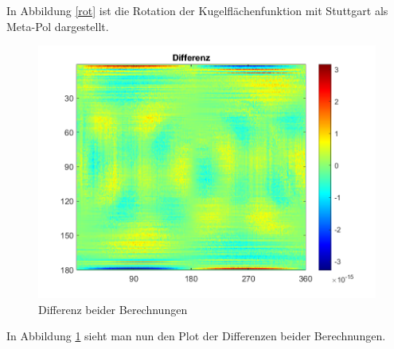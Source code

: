 In Abbildung \ref{rot} ist die Rotation der Kugelflächenfunktion mit Stuttgart als Meta-Pol dargestellt. 

\begin{figure}[H]
 	\centering
 	\includegraphics[scale = 0.6]{diff.png}
 	\caption{Differenz beider Berechnungen}
 	\label{diff}
\end{figure}

In Abbildung \ref{diff} sieht man nun den Plot der Differenzen beider Berechnungen. 